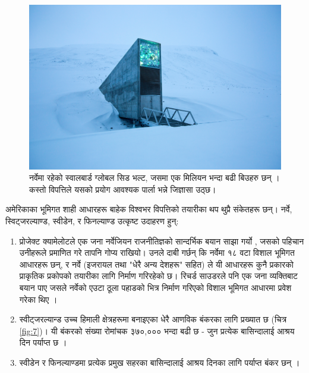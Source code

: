 \documentclass[10pt,twocolumn,letterpaper]{article}
\begin{document}
\begin{figure}[t]
\begin{center}
   \includegraphics[width=1\linewidth]{svalbard.jpg}
\end{center}
   \caption{नर्वेमा रहेको स्वालबार्ड ग्लोबल सिड भल्ट, जसमा एक मिलियन भन्दा बढी बिउहरु छन् \cite{24}। कस्तो विपत्तिले यसको प्रयोग आवश्यक पार्ला भन्ने जिज्ञासा उठ्छ।}
\label{fig:8}
\label{fig:onecol}
\end{figure}

अमेरिकाका भूमिगत शाही आधारहरू बाहेक विश्वभर विपत्तिको तयारीका थप थुप्रै संकेतहरू छन्। नर्वे, स्विट्जरल्याण्ड, स्वीडेन, र फिनल्याण्ड उत्कृष्ट उदाहरण हुन्:

\begin{flushleft}
\begin{enumerate}
    \item प्रोजेक्ट क्यामेलोटले एक जना नर्वेजियन राजनीतिज्ञको सान्दर्भिक बयान साझा गर्यो \cite{25,26}, जसको पहिचान उनीहरूले प्रमाणित गरे तापनि गोप्य राखियो। उनले दाबी गर्छन् कि नर्वेमा १८ वटा विशाल भूमिगत आधारहरू छन्, र नर्वे (इजरायल तथा "धेरै अन्य देशहरू" सहित) ले यी आधारहरू कुनै प्रकारको प्राकृतिक प्रकोपको तयारीका लागि निर्माण गरिरहेको छ। रिचर्ड साउडरले पनि एक जना व्यक्तिबाट बयान पाए जसले नर्वेको एउटा ठूला पहाडको भित्र निर्माण गरिएको विशाल भूमिगत आधारमा प्रवेश गरेका थिए \cite{22}।
    \item स्वीट्जरल्यान्ड उच्च हिमाली क्षेत्रहरूमा बनाइएका धेरै आणविक बंकरका लागि प्रख्यात छ (चित्र \ref{fig:7})। यी बंकरको संख्या रोमांचक ३७०,००० भन्दा बढी छ - जुन प्रत्येक बासिन्दालाई आश्रय दिन पर्याप्त छ \cite{27}।
    \item स्वीडेन र फिनल्याण्डमा प्रत्येक प्रमुख सहरका बासिन्दालाई आश्रय दिनका लागि पर्याप्त बंकर छन् \cite{27}।
\end{enumerate}
\end{flushleft}
\end{document}
